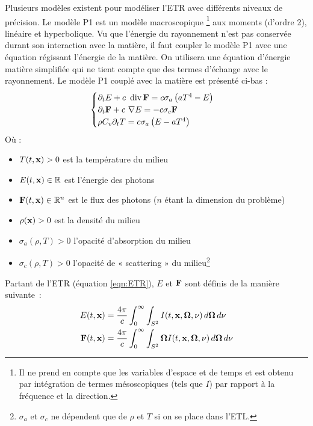 Plusieurs modèles existent pour modéliser l'ETR avec différents niveaux de précision. Le modèle P1 est un modèle macroscopique \footnote{Il ne prend en compte que les variables d'espace et de temps et est obtenu par intégration de termes mésoscopiques (tels que $I$) par rapport à la fréquence et la direction.} aux moments (d'ordre 2), linéaire et hyperbolique. Vu que l'énergie du rayonnement n'est pas conservée durant son interaction avec la matière, il faut coupler le modèle P1 avec une équation régissant l'énergie de la matière. On utilisera une équation d'énergie matière simplifiée qui ne tient compte que des termes d'échange avec le rayonnement. Le modèle P1 couplé avec la matière est présenté ci-bas \parencite{Reference2} :
\begingroup
\large
\begin{equation}
    \begin{cases}
     \partial_tE + c \ \operatorname {div} \mathbf{F} = c\sigma_a\left(aT^4-E\right)\\
     \partial_t\mathbf{F} + c \ \nabla E = -c\sigma_c \mathbf{F} \\
     \rho C_v \partial_t T = c \sigma_a \left(E-aT^4\right)
    \end{cases}
\label{eqn:P1}
\end{equation}
\endgroup
Où :
\begin{itemize}
    \item $T(t,\mathbf{x}) > 0$ est la température du milieu 
    \item $E(t,\mathbf{x}) \in \mathbb{R}$ est l'énergie des photons
    \item $\mathbf{F}(t,\mathbf{x}) \in \mathbb{R}^n $ est le flux des photons ($n$ étant la dimension du problème)
    \item $\rho(\mathbf{x}) > 0$ est la densité du milieu
    \item $\sigma_a(\rho, T) > 0$ l'opacité d'absorption du milieu
    \item $\sigma_c(\rho, T) > 0$ l'opacité de « scattering » du milieu\footnote{$\sigma_a$ et $\sigma_c$ ne dépendent que de $\rho$ et $T$ si on se place dans l'ETL.}
\end{itemize}

Partant de l'ETR (équation \ref{eqn:ETR}), $E$ et $\mathbf{F}$ sont définis de la manière suivante :
\begin{align*}
E(t,\mathbf{x}) &= \frac{4\pi}{c} \int_{0}^{\infty} \int_{S^2} I(t,\mathbf{x},\bm{\Omega},\nu) \, d\bm{\Omega} \, d\nu \\
\mathbf{F}(t,\mathbf{x}) &= \frac{4\pi}{c} \int_{0}^{\infty} \int_{S^2} \bm{\Omega}I(t,\mathbf{x},\bm{\Omega},\nu) \, d\bm{\Omega} \, d\nu 
\label{eqn:EFT}
\end{align*}

